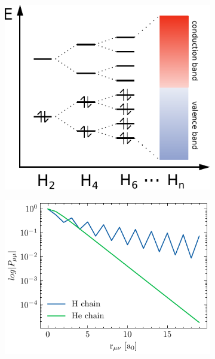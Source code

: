 \begin{figure}
\centering
\begin{subfigure}{0.45\linewidth}
\centering
\includegraphics[scale=0.8]{Pics/MOchain}
\caption{}
\end{subfigure}
\begin{subfigure}{0.45\linewidth}
\centering
\includegraphics[scale=0.8]{density_decay}
\caption{}
\end{subfigure}
\end{figure}



